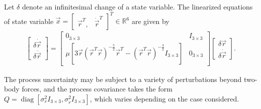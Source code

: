 \documentclass[letterpaper, paper,10pt]{AAS}		%
\newcommand{\expm}{\ensuremath{\mathrm{expm}}}
\newcommand{\diag}{\mathop{\mathrm{diag}}\nolimits}
\renewcommand{\Re}{\ensuremath{\mathbb{R}}}
\begin{document}
Let $\delta$ denote an infinitesimal change of a state variable.
The linearized equations of state variable $\vec x=\begin{bmatrix}\vec r^T, & \dot{\vec r}^T\end{bmatrix}^T\in\Re^6$ are given by
\begin{align}
\begin{bmatrix}
\delta\dot{\vec r} \\ \delta\ddot{\vec r}
\end{bmatrix}
=
\begin{bmatrix}
0_{3\times3} & I_{3\times3} \\
\mu\left[3\vec r({\vec r}^T\vec r)^{-\frac52}{\vec r}^T-({\vec r}^T\vec r)^{-\frac32}I_{3\times3}\right] & 0_{3\times3}
\end{bmatrix}
\begin{bmatrix}
\delta\vec r \\ \delta\dot{\vec r}
\end{bmatrix}
.
\end{align}

The process uncertainty may be subject to a variety of perturbations beyond two-body forces, and the process covariance takes the form $Q=\diag[\sigma_r^2I_{3\times3}, \sigma_{\dot r}^2I_{3\times3}]$, which varies depending on the case considered.
\end{document}
